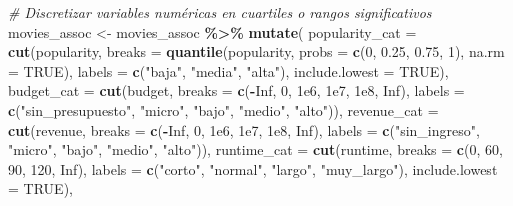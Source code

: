 \documentclass[
]{article}
\newenvironment{Shaded}{\begin{snugshade}}{\end{snugshade}}
\newcommand{\AttributeTok}[1]{\textcolor[rgb]{0.13,0.29,0.53}{#1}}
\newcommand{\CommentTok}[1]{\textcolor[rgb]{0.56,0.35,0.01}{\textit{#1}}}
\newcommand{\ConstantTok}[1]{\textcolor[rgb]{0.56,0.35,0.01}{#1}}
\newcommand{\DecValTok}[1]{\textcolor[rgb]{0.00,0.00,0.81}{#1}}
\newcommand{\FloatTok}[1]{\textcolor[rgb]{0.00,0.00,0.81}{#1}}
\newcommand{\FunctionTok}[1]{\textcolor[rgb]{0.13,0.29,0.53}{\textbf{#1}}}
\newcommand{\NormalTok}[1]{#1}
\newcommand{\OtherTok}[1]{\textcolor[rgb]{0.56,0.35,0.01}{#1}}
\newcommand{\SpecialCharTok}[1]{\textcolor[rgb]{0.81,0.36,0.00}{\textbf{#1}}}
\newcommand{\StringTok}[1]{\textcolor[rgb]{0.31,0.60,0.02}{#1}}
\begin{document}
\begin{Shaded}
\begin{Highlighting}[]
\CommentTok{\# Discretizar variables numéricas en cuartiles o rangos significativos}
\NormalTok{movies\_assoc }\OtherTok{\textless{}{-}}\NormalTok{ movies\_assoc }\SpecialCharTok{\%\textgreater{}\%}
  \FunctionTok{mutate}\NormalTok{(}
    \AttributeTok{popularity\_cat =} \FunctionTok{cut}\NormalTok{(popularity,}
                         \AttributeTok{breaks =} \FunctionTok{quantile}\NormalTok{(popularity, }\AttributeTok{probs =} \FunctionTok{c}\NormalTok{(}\DecValTok{0}\NormalTok{, }\FloatTok{0.25}\NormalTok{, }\FloatTok{0.75}\NormalTok{, }\DecValTok{1}\NormalTok{), }\AttributeTok{na.rm =} \ConstantTok{TRUE}\NormalTok{),}
                         \AttributeTok{labels =} \FunctionTok{c}\NormalTok{(}\StringTok{"baja"}\NormalTok{, }\StringTok{"media"}\NormalTok{, }\StringTok{"alta"}\NormalTok{),}
                         \AttributeTok{include.lowest =} \ConstantTok{TRUE}\NormalTok{),}
    \AttributeTok{budget\_cat =} \FunctionTok{cut}\NormalTok{(budget,}
                     \AttributeTok{breaks =} \FunctionTok{c}\NormalTok{(}\SpecialCharTok{{-}}\ConstantTok{Inf}\NormalTok{, }\DecValTok{0}\NormalTok{, }\FloatTok{1e6}\NormalTok{, }\FloatTok{1e7}\NormalTok{, }\FloatTok{1e8}\NormalTok{, }\ConstantTok{Inf}\NormalTok{),}
                     \AttributeTok{labels =} \FunctionTok{c}\NormalTok{(}\StringTok{"sin\_presupuesto"}\NormalTok{, }\StringTok{"micro"}\NormalTok{, }\StringTok{"bajo"}\NormalTok{, }\StringTok{"medio"}\NormalTok{, }\StringTok{"alto"}\NormalTok{)),}
    \AttributeTok{revenue\_cat =} \FunctionTok{cut}\NormalTok{(revenue,}
                      \AttributeTok{breaks =} \FunctionTok{c}\NormalTok{(}\SpecialCharTok{{-}}\ConstantTok{Inf}\NormalTok{, }\DecValTok{0}\NormalTok{, }\FloatTok{1e6}\NormalTok{, }\FloatTok{1e7}\NormalTok{, }\FloatTok{1e8}\NormalTok{, }\ConstantTok{Inf}\NormalTok{),}
                      \AttributeTok{labels =} \FunctionTok{c}\NormalTok{(}\StringTok{"sin\_ingreso"}\NormalTok{, }\StringTok{"micro"}\NormalTok{, }\StringTok{"bajo"}\NormalTok{, }\StringTok{"medio"}\NormalTok{, }\StringTok{"alto"}\NormalTok{)),}
    \AttributeTok{runtime\_cat =} \FunctionTok{cut}\NormalTok{(runtime,}
                      \AttributeTok{breaks =} \FunctionTok{c}\NormalTok{(}\DecValTok{0}\NormalTok{, }\DecValTok{60}\NormalTok{, }\DecValTok{90}\NormalTok{, }\DecValTok{120}\NormalTok{, }\ConstantTok{Inf}\NormalTok{),}
                      \AttributeTok{labels =} \FunctionTok{c}\NormalTok{(}\StringTok{"corto"}\NormalTok{, }\StringTok{"normal"}\NormalTok{, }\StringTok{"largo"}\NormalTok{, }\StringTok{"muy\_largo"}\NormalTok{),}
                      \AttributeTok{include.lowest =} \ConstantTok{TRUE}\NormalTok{),}

\end{Highlighting}
\end{Shaded}
\end{document}
